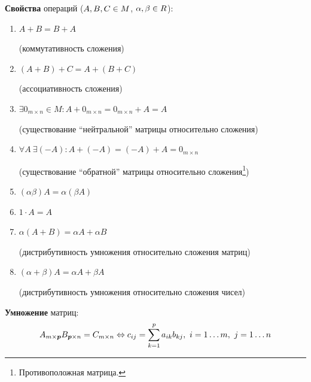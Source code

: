 \documentclass[a4paper,12pt]{article}
\begin{document}
    \textbf{Свойства} операций ($A, B, C \hm\in M$, $\alpha, \beta \hm\in R$):
    \begin{enumerate}
      \item $A + B = B + A$
      
      (коммутативность сложения)
      
      \item $(A + B) + C = A + (B + C)$
      
      (ассоциативность сложения)
      
      \item $\exists 0_{m\times n} \in M: A + 0_{m\times n} = 0_{m\times n} + A = A$
      
      (существование ``нейтральной'' матрицы относительно сложения)
      
      \item $\forall A\ \exists (-A): A + (-A) = (-A) + A = 0_{m\times n}$
      
      (существование ``обратной'' матрицы относительно сложения\footnote{Противоположная матрица.})
      
      \item $(\alpha \beta) A = \alpha (\beta A)$
      \item $1 \cdot A = A$
      \item $\alpha (A + B) = \alpha A + \alpha B$
      
      (дистрибутивность умножения относительно сложения матриц)
      
      \item $(\alpha + \beta) A = \alpha A + \beta A$
      
      (дистрибутивность умножения относительно сложения чисел)
    \end{enumerate}
    
    \textbf{Умножение} матриц:
    \[
      A_{m\times \boldsymbol p} B_{\boldsymbol p \times n} = C_{m\times n} \Leftrightarrow c_{ij} = \sum\limits_{k = 1}^p a_{ik} b_{kj},\ i = 1 \ldots m,\ j = 1 \ldots n
    \]
    
\end{document}
